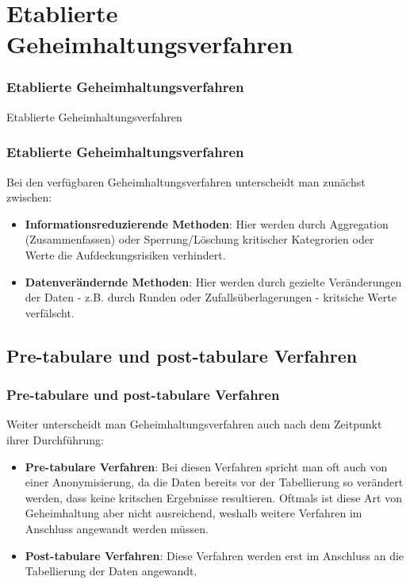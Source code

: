 \documentclass[aspectratio=169]{beamer}
\begin{document}
\section{Etablierte Geheimhaltungsverfahren}

\begin{frame}{}
	\frametitle{Etablierte Geheimhaltungsverfahren}
    \begin{center}
        \huge Etablierte Geheimhaltungsverfahren
    \end{center}
\end{frame}


\begin{frame}
    \frametitle{Etablierte Geheimhaltungsverfahren}
    Bei den verfügbaren Geheimhaltungsverfahren unterscheidt man zunächst zwischen:
    \begin{itemize}
        \item \textbf{Informationsreduzierende Methoden}: Hier werden durch Aggregation (Zusammenfassen) oder Sperrung/Löschung kritischer Kategrorien oder Werte die Aufdeckungsrisiken verhindert.
        \item \textbf{Datenverändernde Methoden}: Hier werden durch gezielte Veränderungen der Daten - z.B. durch Runden oder Zufallsüberlagerungen - kritsiche Werte verfälscht.
    \end{itemize}
\end{frame}


\subsection{Pre-tabulare und post-tabulare Verfahren}

\begin{frame}
    \frametitle{Pre-tabulare und post-tabulare Verfahren}
    Weiter unterscheidt man Geheimhaltungsverfahren auch nach dem Zeitpunkt ihrer Durchführung:
    \begin{itemize}
        \item \textbf{Pre-tabulare Verfahren}: Bei diesen Verfahren spricht man oft auch von einer Anonymisierung, da die Daten bereits vor der Tabellierung so verändert werden, dass keine kritschen Ergebnisse resultieren. Oftmals ist diese Art von Geheimhaltung aber nicht ausreichend, weshalb weitere Verfahren im Anschluss angewandt werden müssen.
        \item \textbf{Post-tabulare Verfahren}: Diese Verfahren werden erst im Anschluss an die Tabellierung der Daten angewandt.
    \end{itemize}
\end{frame}
\end{document}
